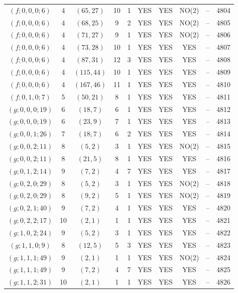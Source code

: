 \begin{longtable}{|c|c|c|c|c|c|c|c|c|c|}
$(f; 0, 0, 0; 6)$ & 4 & $(65, 27)$ & 10 & 1 & YES & YES & NO(2) & -- & 4804\\
$(f; 0, 0, 0; 6)$ & 4 & $(68, 25)$ & 9 & 2 & YES & YES & NO(2) & -- & 4805\\
$(f; 0, 0, 0; 6)$ & 4 & $(71, 27)$ & 9 & 1 & YES & YES & NO(2) & -- & 4806\\
$(f; 0, 0, 0; 6)$ & 4 & $(73, 28)$ & 10 & 1 & YES & YES & YES & -- & 4807\\
$(f; 0, 0, 0; 6)$ & 4 & $(87, 31)$ & 12 & 3 & YES & YES & YES & -- & 4808\\
$(f; 0, 0, 0; 6)$ & 4 & $(115, 44)$ & 10 & 1 & YES & YES & YES & -- & 4809\\
$(f; 0, 0, 0; 6)$ & 4 & $(167, 46)$ & 11 & 1 & YES & YES & YES & -- & 4810\\
$(f; 0, 1, 0; 7)$ & 5 & $(50, 21)$ & 8 & 1 & YES & YES & YES & -- & 4811\\
$(g; 0, 0, 0; 19)$ & 6 & $(18, 7)$ & 6 & 1 & YES & YES & YES & -- & 4812\\
$(g; 0, 0, 0; 19)$ & 6 & $(23, 9)$ & 7 & 1 & YES & YES & YES & -- & 4813\\
$(g; 0, 0, 1; 26)$ & 7 & $(18, 7)$ & 6 & 2 & YES & YES & YES & -- & 4814\\
$(g; 0, 0, 2; 11)$ & 8 & $(5, 2)$ & 3 & 1 & YES & YES & NO(2) & -- & 4815\\
$(g; 0, 0, 2; 11)$ & 8 & $(21, 5)$ & 8 & 1 & YES & YES & YES & -- & 4816\\
$(g; 0, 1, 2; 14)$ & 9 & $(7, 2)$ & 4 & 7 & YES & YES & YES & -- & 4817\\
$(g; 0, 2, 0; 29)$ & 8 & $(5, 2)$ & 3 & 1 & YES & YES & NO(2) & -- & 4818\\
$(g; 0, 2, 0; 29)$ & 8 & $(9, 2)$ & 5 & 1 & YES & YES & NO(2) & -- & 4819\\
$(g; 0, 2, 1; 40)$ & 9 & $(7, 2)$ & 4 & 1 & YES & YES & YES & -- & 4820\\
$(g; 0, 2, 2; 17)$ & 10 & $(2, 1)$ & 1 & 1 & YES & YES & YES & -- & 4821\\
$(g; 1, 0, 2; 24)$ & 9 & $(5, 2)$ & 3 & 1 & YES & YES & YES & -- & 4822\\
$(g; 1, 1, 0; 9)$ & 8 & $(12, 5)$ & 5 & 3 & YES & YES & YES & -- & 4823\\
$(g; 1, 1, 1; 49)$ & 9 & $(2, 1)$ & 1 & 1 & YES & YES & NO(2) & -- & 4824\\
$(g; 1, 1, 1; 49)$ & 9 & $(7, 2)$ & 4 & 7 & YES & YES & YES & -- & 4825\\
$(g; 1, 1, 2; 31)$ & 10 & $(2, 1)$ & 1 & 1 & YES & YES & YES & -- & 4826\\

\end{longtable}
